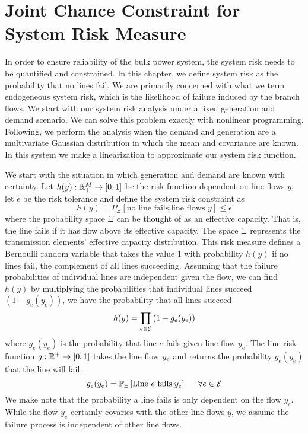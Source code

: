\section{Joint Chance Constraint for System Risk Measure} \label{jointchanceconstraint}
In order to ensure reliability of the bulk power system, the system risk needs to be quantified and constrained. In this chapter, we define system risk as the probability that no lines fail.  We are primarily concerned with what we term endogeneous system risk, which is the likelihood of failure induced by the branch flows.  We start with our system risk analysis under a fixed generation and demand scenario.  We can solve this problem exactly with nonlinear programming.  Following, we perform the analysis when the demand and generation are a multivariate Gaussian distribution in which the mean and covariance are known.  In this system we make a linearization to approximate our system risk function.   

We start with the situation in which generation and demand are known with certainty.  Let $h(y) : \mathbb{R}^{M}_+ \rightarrow \left[ 0, 1 \right]$ be the risk function dependent on line flows $y$, let $\epsilon$ be the risk tolerance and define the system risk constraint as
\begin{equation}\label{systemriskmeasure}
h(y) = P_\Xi \left[ \mbox{no line fails} | \mbox{line flows } y\right] \leq \epsilon
\end{equation}
where the probability space $\Xi$  can be thought of as an effective capacity.  That is, the line fails if it has flow above its effective capacity.  The space $\Xi$ represents the transmission elements' effective capacity distribution.  
This risk measure  defines a Bernoulli random variable that takes the value 1 with probability $h(y)$ if no lines fail, the complement of all lines succeeding.  Assuming that the failure probabilities of individual lines are independent given the flow, we can find $h(y)$ by multiplying the probabilities that individual lines succeed $(1-g_e(y_e))$, we have the probability that all lines succeed
\begin{equation}  \label{nofail}
h(y) = \prod_{e \in \mathcal{E}} \left( 1 - g_e(y_e) \right)
\end{equation}  
where $g_e(y_e)$ is the probability that line $e$ fails given line flow $y_e$.   The line risk function $g : \mathbb{R}^{+} \rightarrow [0,1]$ takes the line flow $y_e$ and returns the probability $g_e(y_e)$ that the line will fail.   
\begin{equation}
 g_e(\hy_e) = \bP{\Xi}{\text{Line }e\text{ fails} | \hy_e}  \hspace{15px} \forall e \in \cE
\end{equation}
We make note that the probability a line fails is only dependent on the flow $y_e$.  While the flow $y_e$ certainly covaries with the other line flows $y$, we assume the failure process is independent of other line flows.

